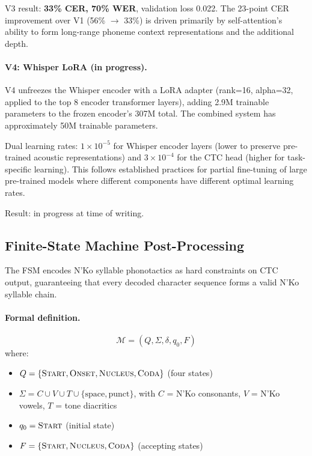 \documentclass[11pt]{article}
\begin{document}
V3 result: \textbf{33\% CER, 70\% WER}, validation loss 0.022.
The 23-point CER improvement over V1 (56\% $\to$ 33\%) is driven primarily by self-attention's ability to form long-range phoneme context representations and the additional depth.

\paragraph{V4: Whisper LoRA (in progress).}
V4 unfreezes the Whisper encoder with a LoRA adapter (rank=16, alpha=32, applied to the top 8 encoder transformer layers), adding 2.9M trainable parameters to the frozen encoder's 307M total.
The combined system has approximately 50M trainable parameters.

Dual learning rates: $1 \times 10^{-5}$ for Whisper encoder layers (lower to preserve pre-trained acoustic representations) and $3 \times 10^{-4}$ for the CTC head (higher for task-specific learning).
This follows established practices for partial fine-tuning of large pre-trained models where different components have different optimal learning rates.

Result: in progress at time of writing.

\subsection{Finite-State Machine Post-Processing}
\label{sec:fsm}

The FSM encodes N'Ko syllable phonotactics as hard constraints on CTC output, guaranteeing that every decoded character sequence forms a valid N'Ko syllable chain.

\paragraph{Formal definition.}
\begin{equation}
\mathcal{M} = (Q, \Sigma, \delta, q_0, F)
\end{equation}
where:
\begin{itemize}
\item $Q = \{\textsc{Start}, \textsc{Onset}, \textsc{Nucleus}, \textsc{Coda}\}$ (four states)
\item $\Sigma = C \cup V \cup T \cup \{\text{space}, \text{punct}\}$, with $C$ = N'Ko consonants, $V$ = N'Ko vowels, $T$ = tone diacritics
\item $q_0 = \textsc{Start}$ (initial state)
\item $F = \{\textsc{Start}, \textsc{Nucleus}, \textsc{Coda}\}$ (accepting states)
\end{itemize}
\end{document}
